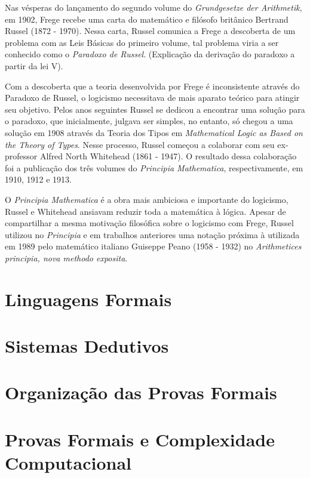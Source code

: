 Nas vésperas do lançamento do segundo volume do \textit{Grundgesetze der Arithmetik}, em 1902, Frege recebe uma carta do matemático e filósofo britânico Bertrand  Russel (1872 - 1970). Nessa carta, Russel comunica a Frege a descoberta de um problema com as Leis Básicas do primeiro volume, tal problema viria a ser conhecido como o \textit{Paradoxo de Russel}. (Explicação da derivação do paradoxo a partir da lei V).

Com a descoberta que a teoria desenvolvida por Frege é inconsistente através do Paradoxo de Russel, o logicismo necessitava de mais aparato teórico para atingir seu objetivo. Pelos anos seguintes Russel se dedicou a encontrar uma solução para o paradoxo, que inicialmente, julgava ser simples, no entanto, só chegou a uma solução em 1908 através da Teoria dos Tipos em \textit{Mathematical Logic as Based on the Theory of Types}. Nesse processo, Russel começou a colaborar com seu ex-professor Alfred North Whitehead (1861 - 1947). O resultado dessa colaboração foi a publicação dos três volumes do \textit{Principia Mathematica}, respectivamente, em 1910, 1912 e 1913.

O \textit{Principia Mathematica} é a obra mais ambiciosa e importante do logicismo, Russel e Whitehead ansiavam reduzir toda a matemática à lógica. Apesar de compartilhar a mesma motivação filosófica sobre o logicismo com Frege, Russel utilizou no \textit{Principia} e em trabalhos anteriores uma notação próxima à utilizada em 1989 pelo matemático italiano Guiseppe Peano (1958 - 1932) no \textit{Arithmetices principia, nova methodo exposita}.

\section{Linguagens Formais}

\section{Sistemas Dedutivos}

\section{Organização das Provas Formais}

\section{Provas Formais e Complexidade Computacional}